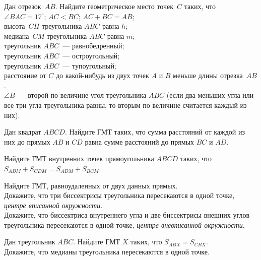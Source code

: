 \begin{problems}

\item
Дан отрезок~$AB$.
Найдите геометрическое место точек~$C$ таких, что
\\
\subproblem $\angle{BAC} = 17^{\circ}$;
\quad
\subproblem $AC < BC$;
\quad
\subproblem $AC + BC = AB$;
\\
\subproblem высота~$CH$ треугольника $ABC$ равна $h$;
\\
\subproblem медиана~$CM$ треугольника $ABC$ равна $m$;
\\
\subproblem треугольник $ABC$~--- равнобедренный;
\\
\subproblem треугольник $ABC$~--- остроугольный;
\\
\subproblem треугольник $ABC$~--- тупоугольный;
\\
\subproblem
расстояние от $C$ до какой-нибудь из двух точек $A$ и $B$ меньше длины
отрезка~$AB$.
\\
\subproblem
$\angle B $~--- второй по величине угол треугольника $ABC$
(если два меньших угла или все три угла треугольника равны, то вторым
по величине считается каждый из них).



\item
Дан квадрат $ABCD$.
Найдите ГМТ таких, что сумма расстояний от каждой из них до прямых $AB$ и $CD$
равна сумме расстояний до прямых $BC$ и $AD$.

\item
Найдите ГМТ внутренних точек прямоугольника $ABCD$ таких, что
$S_{ABM} + S_{CDM} = S_{ADM} + S_{BCM}$.

\item
\subproblem
Найдите ГМТ, равноудаленных от двух данных прямых.
\\
\subproblem
Докажите, что три биссектрисы треугольника пересекаются в одной точке,
\emph{центре вписанной окружности}.
\\
\subproblem
Докажите, что биссектриса внутреннего угла и две биссектрисы внешних углов
треугольника пересекаются в одной точке, \emph{центре вневписанной окружности}.

\item
\subproblem
Дан треугольник $ABC$.
Найдите ГМТ $X$ таких, что $S_{ABX} = S_{CBX}$.
\\
\subproblem
Докажите, что медианы треугольника пересекаются в одной точке.


\end{problems}
